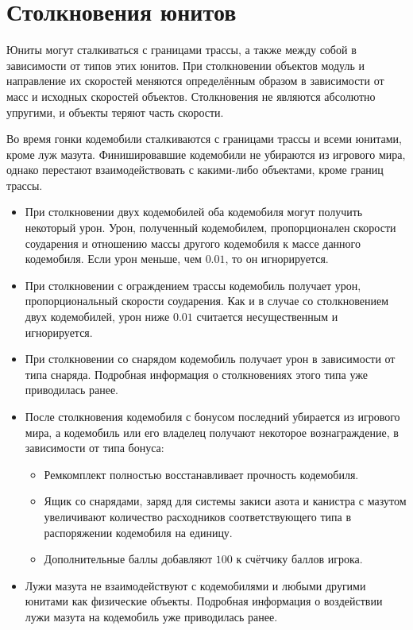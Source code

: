 \section{Столкновения юнитов}

Юниты могут сталкиваться с границами трассы, а также между собой в зависимости от типов этих юнитов. При столкновении объектов модуль и
направление их скоростей меняются определённым образом в зависимости от масс и исходных скоростей объектов. Столкновения не являются
абсолютно упругими, и объекты теряют часть скорости.

Во время гонки кодемобили сталкиваются с границами трассы и всеми юнитами, кроме луж мазута. Финишировавшие кодемобили не убираются из
игрового мира, однако перестают взаимодействовать с какими-либо объектами, кроме границ трассы.

\begin{itemize}
  \item При столкновении двух кодемобилей оба кодемобиля могут получить некоторый урон. Урон, полученный кодемобилем, пропорционален
        скорости соударения и отношению массы другого кодемобиля к массе данного кодемобиля. Если урон меньше, чем $0.01$, то он
        игнорируется.
  \item При столкновении с ограждением трассы кодемобиль получает урон, пропорциональный скорости соударения. Как и в случае со
        столкновением двух кодемобилей, урон ниже $0.01$ считается несущественным и игнорируется.
  \item При столкновении со снарядом кодемобиль получает урон в зависимости от типа снаряда. Подробная информация о столкновениях этого типа
        уже приводилась ранее.
  \item После столкновения кодемобиля с бонусом последний убирается из игрового мира, а кодемобиль или его владелец получают некоторое
        вознаграждение, в зависимости от типа бонуса:
        \begin{itemize}
          \item Ремкомплект полностью восстанавливает прочность кодемобиля.
          \item Ящик со снарядами, заряд для системы закиси азота и канистра с мазутом увеличивают количество расходников соответствующего
                типа в распоряжении кодемобиля на единицу.
          \item Дополнительные баллы добавляют $100$ к счётчику баллов игрока.
        \end{itemize}
  \item Лужи мазута не взаимодействуют с кодемобилями и любыми другими юнитами как физические объекты. Подробная информация о воздействии
        лужи мазута на кодемобиль уже приводилась ранее.
\end{itemize}

